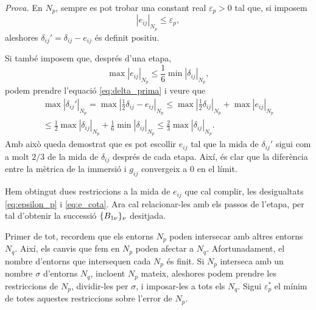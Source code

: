 {\color{black!50!green} \textit{Prova.} 
En $N_p$, sempre es pot trobar una constant real $\varepsilon_p>0$ tal que, si imposem 
\begin{equation}\label{eq:epsilon_p}
    |e_{ij}|_{N_p} \le \varepsilon_p,
\end{equation}
aleshores $\delta_{ij}'= \delta_{ij} - e_{ij}$ és definit positiu.

Si també imposem que, després d'una etapa,
\begin{equation}\label{eq:e_cota}
    \max|e_{ij}|_{N_p} \le \frac16\min|\delta_{ij}|_{N_p},
\end{equation}
podem prendre l'equació \eqref{eq:delta_prima} i veure que
\begin{align}\label{eq:delta_prima_cota}
    \nonumber\max|\delta_{ij}'|_{N_p} = \max\left|\frac12\delta_{ij} - e_{ij}\right|_{N_p} \le \max\left|\frac12\delta_{ij}\right|_{N_p} + \max|e_{ij}|_{N_p} \\
    \le \frac12\max|\delta_{ij}|_{N_p} + \frac16\min|\delta_{ij}|_{N_p} \le \frac23\max|\delta_{ij}|_{N_p}.
\end{align}
Amb això queda demostrat que es pot escollir $e_{ij}$ tal que la mida de $\delta_{ij}'$ sigui com a molt $2/3$ de la mida de $\delta_{ij}$ després de cada etapa. Així, és clar que la diferència entre la mètrica de la immersió i $g_{ij}$ convergeix a $0$ en el límit.

Hem obtingut dues restriccions a la mida de $e_{ij}$ que cal complir, les desigualtats \eqref{eq:epsilon_p} i \eqref{eq:e_cota}. Ara cal relacionar-les amb els passos de l'etapa, per tal d'obtenir la successió $\{B_{1\nu}\}_{\nu}$ desitjada. 

Primer de tot, recordem que els entorns $N_p$ poden intersecar amb altres entorns $N_q$. Així, els canvis que fem en $N_p$ poden afectar a $N_q$. Afortunadament, el nombre d'entorns que intersequen cada $N_p$ és finit. Si $N_p$ interseca amb un nombre $\sigma$ d'entorns $N_q$, incloent $N_p$ mateix, aleshores podem prendre les restriccions de $N_p$, dividir-les per $\sigma$, i imposar-les a tots els $N_q$. Sigui $\varepsilon_p^*$ el mínim de totes aquestes restriccions sobre l'error de $N_p$.

}
